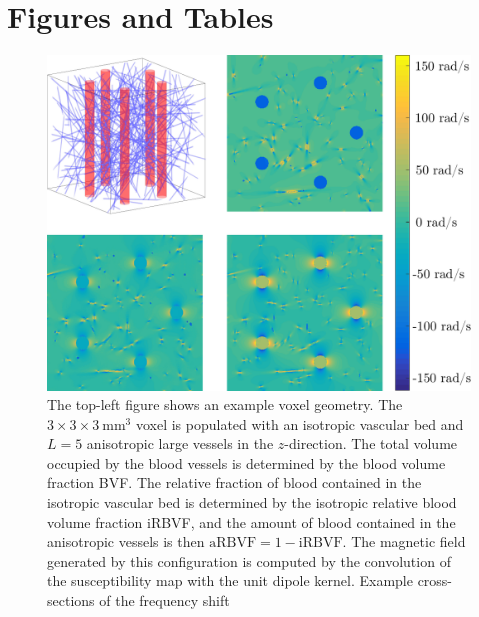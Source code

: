 \documentclass[twocolumn,twoside]{article}
\begin{document}
%

{\footnotesize}

\clearpage
\section*{Figures and Tables}

\begin{figure}[H]
    \centering
    \begin{minipage}{\textwidth}
    \centering
    \includegraphics[keepaspectratio=true,width=\textwidth]{spin_echo/voxelgeo_domega_2x2}
    \caption{ The top-left figure shows an example voxel geometry.
      The $3\times 3\times \SI{3}{\milli\meter^3}$
      voxel is populated with an
      isotropic vascular bed and $L=5$ anisotropic large vessels in
      the $z$-direction. The total volume occupied by the blood
      vessels is determined by the blood volume fraction BVF. The
      relative fraction of blood contained in the isotropic vascular
      bed is determined by the isotropic relative blood volume
      fraction iRBVF, and the amount of blood contained in the
      anisotropic vessels is then $\text{aRBVF} = 1 - \text{iRBVF}$.
      The magnetic field generated by this configuration is computed
      by the convolution of the susceptibility map with the unit
      dipole kernel. Example cross-sections of the frequency shift
}
\end{minipage}
\end{figure}
\end{document}
